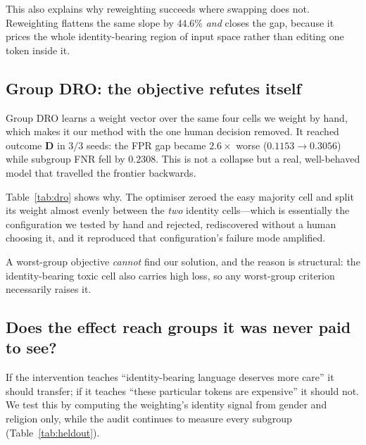 \documentclass[conference]{IEEEtran}
\begin{document}
This also explains why reweighting succeeds where swapping does not. Reweighting
flattens the same slope by $44.6\%$ \emph{and} closes the gap, because it prices
the whole identity-bearing region of input space rather than editing one token
inside it.

\subsection{Group DRO: the objective refutes itself}
\label{sec:dro}
Group DRO learns a weight vector over the same four cells we weight by hand,
which makes it our method with the one human decision removed. It reached outcome
\textbf{D} in $3/3$ seeds: the FPR gap became $2.6\times$ worse
($0.1153 \rightarrow 0.3056$) while subgroup FNR fell by $0.2308$. This is not a
collapse but a real, well-behaved model that travelled the frontier backwards.

Table~\ref{tab:dro} shows why. The optimiser zeroed the easy majority cell and
split its weight almost evenly between the \emph{two} identity cells---which is
essentially the configuration we tested by hand and rejected, rediscovered
without a human choosing it, and it reproduced that configuration's failure mode
amplified.

\begin{table}[t]
\caption{What Group DRO learned, against what we assumed. The learned column
gives the final weight vector for seeds $42/43/44$; our static vector is shown
normalised to sum to one for comparability.}
\label{tab:dro}
\centering
\small

\end{table}

A worst-group objective \emph{cannot} find our solution, and the reason is
structural: the identity-bearing toxic cell also carries high loss, so any
worst-group criterion necessarily raises it.

\subsection{Does the effect reach groups it was never paid to see?}
\label{sec:heldout}
If the intervention teaches ``identity-bearing language deserves more care'' it
should transfer; if it teaches ``these particular tokens are expensive'' it
should not. We test this by computing the weighting's identity signal from gender
and religion only, while the audit continues to measure every subgroup
(Table~\ref{tab:heldout}).

\begin{table}[t]
\caption{The held-out experiment over eight seeds. \texttt{main} is shown under
the same axis split, which removes the dose confound: the weighted axes improve
by essentially the same amount in both runs, so the movement on the untouched
axes is transfer rather than a diluted dose.}
\label{tab:heldout}
\centering
\small
\setlength{\tabcolsep}{4pt}

\end{table}
\end{document}
